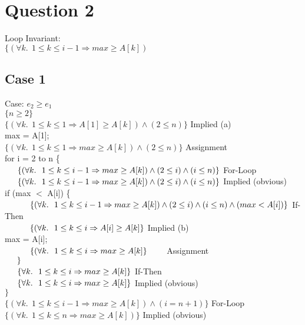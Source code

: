 \documentclass{article}[12pt]
\begin{document}
\newpage
\section*{Question 2}

Loop Invariant: \\
$\{(\forall k. \ \ 1 \le k \le i-1 \Rightarrow max \ge A[k])$ \\

\subsection*{Case 1}

Case: $e_{2} \ge e_{1}$ \\
$\{n \ge 2\}$ \\
$\{(\forall k. \ \ 1 \le k \le 1 \Rightarrow A[1] \ge A[k]) \land (2 \le n)\}$ \qquad Implied (a) \\
max = A[1]; \\
$\{(\forall k. \ \ 1 \le k \le 1 \Rightarrow max \ge A[k]) \land (2 \le n)\}$ \qquad Assignment \\
for i = 2 to n \{ \\
$\indent \{(\forall k. \ \ 1 \le k \le i-1 \Rightarrow max \ge A[k]) \land (2 \le i) \land (i \le n)\}$ \qquad For-Loop \\
$\indent \{(\forall k. \ \ 1 \le k \le i-1 \Rightarrow max \ge A[k]) \land (2 \le i) \land (i \le n)\}$ \qquad Implied (obvious) \\
\indent if (max $<$ A[i]) \{ \\
$\indent \indent \{(\forall k. \ \  1 \le k \le i-1 \Rightarrow max \ge A[k]) \land (2 \le i) \land (i \le n) \land (max < A[i])\}$ \qquad If-Then \\
$\indent \indent \{(\forall k. \ \ 1 \le k \le i \Rightarrow A[i] \ge A[k]\}$ \qquad Implied (b) \\
\indent \indent max = A[i]; \\
$\indent \indent \{(\forall k. \ \  1 \le k \le i \Rightarrow max \ge A[k]\} \qquad$ Assignment \\
$\indent \}$ \\
$\indent \{\forall k. \ \ 1 \le k \le i \Rightarrow max \ge A[k]\}$ \qquad If-Then \\
$\indent \{\forall k. \ \ 1 \le k \le i \Rightarrow max \ge A[k]\}$ \qquad Implied (obvious) \\
$\}$ \\
$\{(\forall k. \ \ 1 \le k \le i-1 \Rightarrow max \ge A[k]) \land (i = n+1) \}$ \qquad For-Loop \\
$\{(\forall k. \ \ 1 \le k \le n \Rightarrow max \ge A[k])\}$ \qquad Implied (obvious) \\
\end{document}
